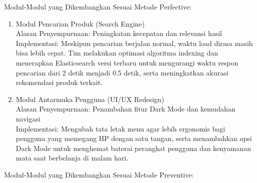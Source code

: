 \begin{enumerate}[leftmargin=*, label=\textbf{\arabic*.}]
            \vspace{0.5cm}

            Modul-Modul yang Dikembangkan Sesuai Metode Perfective:

            \begin{enumerate}[leftmargin=0.5cm, label=\textbf{\arabic*.}]
                  \item Modul Pencarian Produk (Search Engine)\\
                        Alasan Penyempurnaan: Peningkatan kecepatan dan relevansi hasil\\
                        Implementasi: Meskipun pencarian berjalan normal, waktu load dirasa masih bisa lebih cepat. Tim melakukan optimasi algoritma indexing dan menerapkan Elasticsearch versi terbaru untuk mengurangi waktu respon pencarian dari 2 detik menjadi 0.5 detik, serta meningkatkan akurasi rekomendasi produk terkait.\\
                  \item Modul Antarmuka Pengguna (UI/UX Redesign)\\
                        Alasan Penyempurnaan: Penambahan fitur Dark Mode dan kemudahan navigasi\\
                        Implementasi: Mengubah tata letak menu agar lebih ergonomis bagi pengguna yang memegang HP dengan satu tangan, serta menambahkan opsi Dark Mode untuk menghemat baterai perangkat pengguna dan kenyamanan mata saat berbelanja di malam hari.
            \end{enumerate}

            \vspace{0.5cm}

            Modul-Modul yang Dikembangkan Sesuai Metode Preventive:


\end{enumerate}
